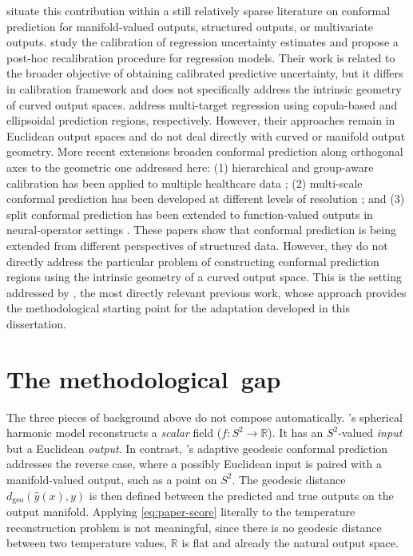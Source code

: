 \documentclass[11pt,a4paper]{report}
\newcommand{\dgeo}{d_{\mathrm{geo}}}
\begin{document}
\citet{amirishahbazi2026} situate this contribution within a still relatively sparse literature on conformal prediction for manifold-valued outputs, structured outputs, or multivariate outputs. \citet{kuleshov2018} study the calibration of regression uncertainty estimates and propose a post-hoc recalibration procedure for regression models. Their work is related to the broader objective of obtaining calibrated predictive uncertainty, but it differs in calibration framework and does not specifically address the intrinsic geometry of curved output spaces. \citet{messoudi2021,messoudi2022} address multi-target regression using copula-based and ellipsoidal prediction regions, respectively. However, their approaches remain in Euclidean output spaces and do not deal directly with curved or manifold output geometry. More recent extensions broaden conformal prediction along orthogonal axes to the geometric one addressed here: (1) hierarchical and group-aware calibration has been applied to multiple healthcare data \citep{amirishahbazi2026health}; (2) multi-scale conformal prediction has been developed at different levels of resolution \citep{baheri2025scales}; and (3) split conformal prediction has been extended to function-valued outputs in neural-operator settings \citep{millard2025neural}. These papers show that conformal prediction is being extended from different perspectives of structured data. However, they do not directly address the particular problem of constructing conformal prediction regions using the intrinsic geometry of a curved output space. This is the setting addressed by \citet{amirishahbazi2026}, the most directly relevant previous work, whose approach provides the methodological starting point for the adaptation developed in this dissertation.

\section{The methodological gap}
\label{sec:adaptation}

The three pieces of background above do not compose automatically. \citet{thomas2025}'s spherical harmonic model reconstructs a \emph{scalar} field ($f: S^2 \to \mathbb{R}$). It has an $S^2$-valued \emph{input} but a Euclidean \emph{output}. In contrast, \citet{amirishahbazi2026}'s adaptive geodesic conformal prediction addresses the reverse case, where a possibly Euclidean input is paired with a manifold-valued output, such as a point on $S^2$. The geodesic distance $\dgeo(\hat y(x), y)$ is then defined between the predicted and true outputs on the output manifold. Applying \cref{eq:paper-score} literally to the temperature reconstruction problem is not meaningful, since there is no geodesic distance between two temperature values, $\mathbb{R}$ is flat and already the natural output space.
\end{document}
